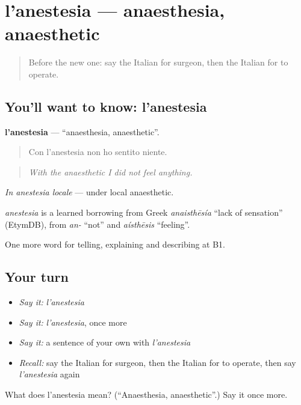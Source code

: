 \section[l'anestesia]{l'anestesia — anaesthesia, anaesthetic}

\label{lesson:IT-C488-anestesia}



\begin{quote}
Before the new one: say the Italian for surgeon, then the Italian for to operate.
\end{quote}

\subsection*{You'll want to know: l'anestesia}
\textbf{l'anestesia} — \textquotedblleft{}anaesthesia, anaesthetic\textquotedblright{}.

\begin{quote}
Con l'anestesia non ho sentito niente.
\end{quote}

\begin{quote}
\emph{With the anaesthetic I did not feel anything.}
\end{quote}

\emph{In anestesia locale} — under local anaesthetic.

\begin{cousinweb}
\emph{anestesia} is a learned borrowing from Greek \emph{anaisthēsía} \textquotedblleft{}lack of sensation\textquotedblright{} (EtymDB), from \emph{an-} \textquotedblleft{}not\textquotedblright{} and \emph{aísthēsis} \textquotedblleft{}feeling\textquotedblright{}.
\end{cousinweb}

\begin{grammarlens}[title={What you've built}]
One more word for telling, explaining and describing at B1.
\end{grammarlens}

\subsection*{Your turn}
\begin{itemize}
\raggedright
  \item \emph{Say it:} \emph{l'anestesia}
  \item \emph{Say it:} \emph{l'anestesia}, once more
  \item \emph{Say it:} a sentence of your own with \emph{l'anestesia}
  \item \emph{Recall:} say the Italian for surgeon, then the Italian for to operate, then say \emph{l'anestesia} again
\end{itemize}

\begin{tcolorbox}[breakable,colback=teal!4,colframe=teal!35!black,title={Before you move on}]
What does l'anestesia mean? (\textquotedblleft{}Anaesthesia, anaesthetic\textquotedblright{}.) Say it once more.
\end{tcolorbox}
